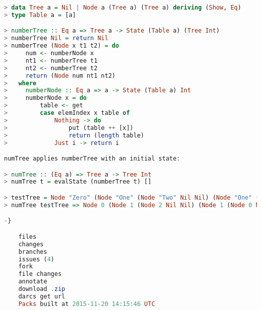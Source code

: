 \begin{lstlisting}[language=Haskell]
> data Tree a = Nil | Node a (Tree a) (Tree a) deriving (Show, Eq)
> type Table a = [a]

> numberTree :: Eq a => Tree a -> State (Table a) (Tree Int)
> numberTree Nil = return Nil
> numberTree (Node x t1 t2) = do
>     num <- numberNode x
>     nt1 <- numberTree t1
>     nt2 <- numberTree t2
>     return (Node num nt1 nt2)
>   where
>     numberNode :: Eq a => a -> State (Table a) Int
>     numberNode x = do
>         table <- get
>         case elemIndex x table of
>             Nothing -> do
>                 put (table ++ [x])
>                 return (length table)
>             Just i -> return i

numTree applies numberTree with an initial state:

> numTree :: (Eq a) => Tree a -> Tree Int
> numTree t = evalState (numberTree t) []

> testTree = Node "Zero" (Node "One" (Node "Two" Nil Nil) (Node "One" (Node "Zero" Nil Nil) Nil)) Nil
> numTree testTree => Node 0 (Node 1 (Node 2 Nil Nil) (Node 1 (Node 0 Nil Nil) Nil)) Nil

-}

    files
    changes
    branches
    issues (4)
    fork
    file changes
    annotate
    download .zip
    darcs get url
    Packs built at 2015-11-20 14:15:46 UTC
\end{lstlisting}
\newpage
